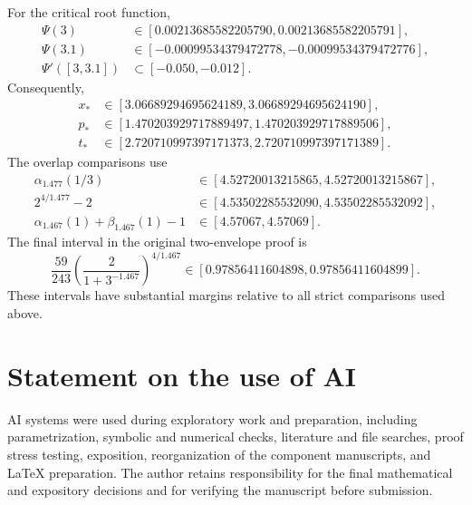 \documentclass[11pt,reqno]{amsart}
\numberwithin{equation}{section}
\theoremstyle{definition}
\theoremstyle{remark}
\begin{document}
For the critical root function,
\begin{align*}
  \Psi(3)&\in[0.00213685582205790,0.00213685582205791],\\
  \Psi(3.1)&\in[-0.00099534379472778,-0.00099534379472776],\\
  \Psi'([3,3.1])&\subset[-0.050,-0.012].
\end{align*}
Consequently,
\begin{align*}
  x_*&\in[3.06689294695624189,3.06689294695624190],\\
  p_*&\in[1.470203929717889497,1.470203929717889506],\\
  t_*&\in[2.720710997397171373,2.720710997397171389].
\end{align*}
The overlap comparisons use
\begin{align*}
  \alpha_{1.477}(1/3)
  &\in[4.52720013215865,4.52720013215867],\\
  2^{4/1.477}-2
  &\in[4.53502285532090,4.53502285532092],\\
  \alpha_{1.467}(1)+\beta_{1.467}(1)-1
  &\in[4.57067,4.57069].
\end{align*}
The final interval in the original two-envelope proof is
\[
  \frac{59}{243}
  \left(\frac2{1+3^{-1.467}}\right)^{4/1.467}
  \in[0.97856411604898,0.97856411604899].
\]
These intervals have substantial margins relative to all strict comparisons
used above.


\section*{Statement on the use of AI}
AI systems were used during exploratory work and preparation, including parametrization, symbolic and numerical checks, literature and file searches, proof stress testing, exposition, reorganization of the component manuscripts, and LaTeX preparation.  The author retains responsibility for the final mathematical and expository decisions and for verifying the manuscript before submission.
\end{document}

